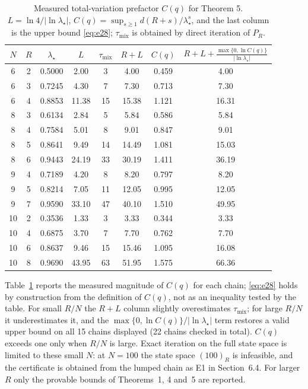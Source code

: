 \documentclass[twoside,11pt]{article}
\begin{document}
\begin{table}[!t]
\small
\centering
\begin{tabular}{@{}cc cccc cc@{}}
\toprule
$N$ & $R$ & $\lambda_\star$ & $L$ & $\tau_{\mathrm{mix}}$ & $R+L$ & $C(q)$ & $R+L+\frac{\max\{0,\ln C(q)\}}{|\ln\lambda_\star|}$ \\
\midrule
6  & 2 & 0.5000 & 2.00  & 3  & 4.00  & 0.459 & 4.00  \\
6  & 3 & 0.7245 & 4.30  & 7  & 7.30  & 0.713 & 7.30  \\
6  & 4 & 0.8853 & 11.38 & 15 & 15.38 & 1.121 & 16.31 \\
8  & 3 & 0.6134 & 2.84  & 5  & 5.84  & 0.586 & 5.84  \\
8  & 4 & 0.7584 & 5.01  & 8  & 9.01  & 0.847 & 9.01  \\
8  & 5 & 0.8641 & 9.49  & 14 & 14.49 & 1.081 & 15.03 \\
8  & 6 & 0.9443 & 24.19 & 33 & 30.19 & 1.411 & 36.19 \\
9  & 4 & 0.7189 & 4.20  & 8  & 8.20  & 0.797 & 8.20  \\
9  & 5 & 0.8214 & 7.05  & 11 & 12.05 & 0.995 & 12.05 \\
9  & 7 & 0.9590 & 33.10 & 47 & 40.10 & 1.510 & 49.95 \\
10 & 2 & 0.3536 & 1.33  & 3  & 3.33  & 0.344 & 3.33  \\
10 & 4 & 0.6875 & 3.70  & 7  & 7.70  & 0.762 & 7.70  \\
10 & 6 & 0.8637 & 9.46  & 15 & 15.46 & 1.095 & 16.08 \\
10 & 8 & 0.9690 & 43.95 & 63 & 51.95 & 1.575 & 66.36 \\
\bottomrule
\end{tabular}
\caption{Measured total-variation prefactor $C(q)$ for Theorem 5. $L=\ln4/|\ln\lambda_\star|$, $C(q)=\sup_{s\geq1}d(R+s)/\lambda_\star^{s}$, and the last column is the upper bound \eqref{eq:e28}; $\tau_{\mathrm{mix}}$ is obtained by direct iteration of $P_R$.}
\label{table:III}
\end{table}

Table~\ref{table:III} reports the measured magnitude of $C(q)$ for each
chain; \eqref{eq:e28} holds by construction from the definition of $C(q)$,
not as an inequality tested by the table.
For small $R/N$ the $R+L$ column slightly overestimates $\tau_{\mathrm{mix}}$;
for large $R/N$ it underestimates it, and the
$\max\{0,\ln C(q)\}/|\ln\lambda_\star|$ term restores a valid upper bound
on all 15 chains displayed (22 chains checked in total). $C(q)$ exceeds one
only when $R/N$ is large. Exact iteration on the full state space is limited
to these small $N$: at $N=100$ the state space $(100)_R$ is infeasible, and
the certificate is obtained from the lumped chain as E1 in Section~6.4.
For larger $R$ only the provable bounds of Theorems~1, 4 and~5 are reported.
\end{document}
